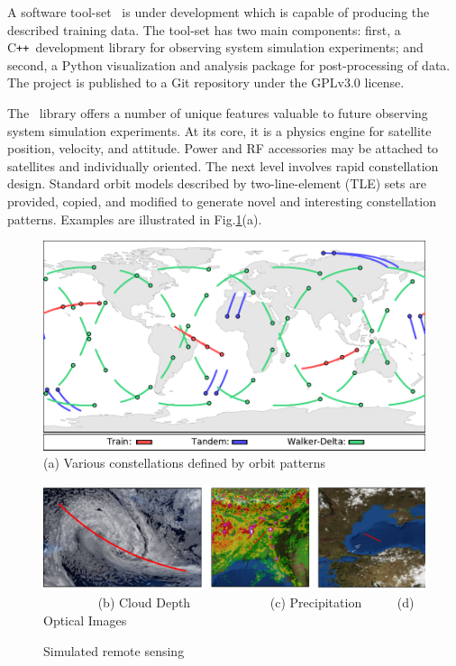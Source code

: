 \documentclass[conference]{IEEEtran}
\newcommand{\project}{{\sc{Collaborate}}~}
\newcommand{\cpp}{C\texttt{++}~}
\begin{document}
A software tool-set \project is under development which is capable of producing the described training data.  The tool-set has two main components: first, a \cpp development library for observing system simulation experiments; and second, a Python visualization and analysis package for post-processing of data.  The project is published to a Git repository under the GPLv3.0 license.

The \project library offers a number of unique features valuable to future observing system simulation experiments.  At its core, it is a physics engine for satellite position, velocity, and attitude.  Power and RF accessories may be attached to satellites and individually oriented.  The next level involves rapid constellation design.  Standard orbit models described by two-line-element (TLE) sets are provided, copied, and modified to generate novel and interesting constellation patterns.  Examples are illustrated in Fig.\ref{fig:sensing}(a).

\begin{figure}[b!]
  \begin{minipage}[b]{\linewidth}
    \begin{center}
      \includegraphics[width=\textwidth]{images/constellations.pdf}
      {\footnotesize(a) Various constellations defined by orbit patterns}
    \end{center}
    \medskip
  \end{minipage}
  \begin{minipage}[b]{\linewidth}
    \begin{center}
      \includegraphics[width=\textwidth]{images/remote_sensing.pdf}
      {\footnotesize{
          \color{white}~~~~~~~~\color{black}
          (b) Cloud Depth~~~~~~~~~~~~
          (c) Precipitation~~~~~
          (d) Optical Images}}
    \end{center}
    \medskip
  \end{minipage}
  \caption{Simulated remote sensing}
  \label{fig:sensing}
\end{figure}
\end{document}
